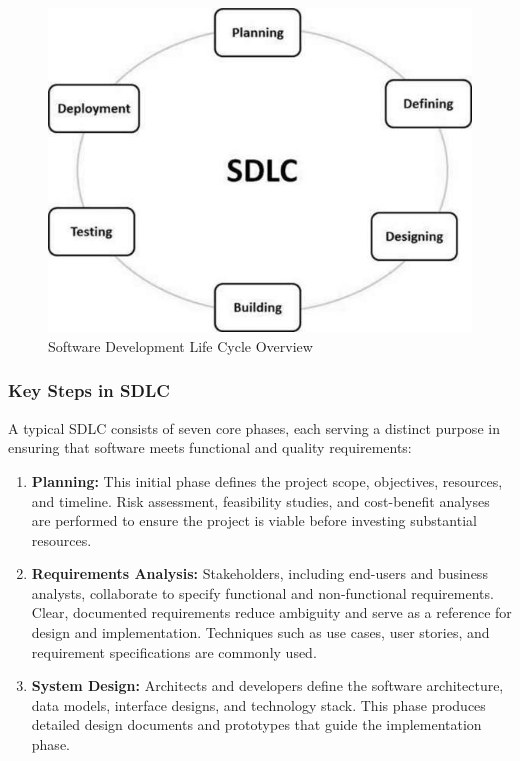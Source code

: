 \begin{spacing}{1.2}
\begin{figure}[H]
    \centering
    \includegraphics[scale=0.65]{Images/sdlc_stages.jpg}
    \caption{Software Development Life Cycle Overview}
    \label{fig:sdlc_cycle}
\end{figure}

\subsubsection*{Key Steps in SDLC}
A typical SDLC consists of seven core phases, each serving a distinct purpose in ensuring that software meets functional and quality requirements:

\begin{enumerate}
    \item \textbf{Planning:} This initial phase defines the project scope, objectives, resources, and timeline. Risk assessment, feasibility studies, and cost-benefit analyses are performed to ensure the project is viable before investing substantial resources.
    
    \item \textbf{Requirements Analysis:} Stakeholders, including end-users and business analysts, collaborate to specify functional and non-functional requirements. Clear, documented requirements reduce ambiguity and serve as a reference for design and implementation. Techniques such as use cases, user stories, and requirement specifications are commonly used.
    
    \item \textbf{System Design:} Architects and developers define the software architecture, data models, interface designs, and technology stack. This phase produces detailed design documents and prototypes that guide the implementation phase.
    

\end{enumerate}
\end{spacing}

